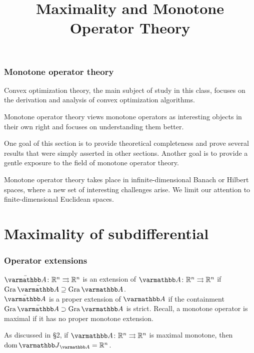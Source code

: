 \documentclass[10pt,mathserif]{beamer}
\title{\large \bfseries Maximality and Monotone Operator Theory}
\begin{document}
\frame{
\thispagestyle{empty}
\titlepage
}


\begin{frame}
\frametitle{Monotone operator theory}
Convex optimization theory, the main subject of study in this class, focuses on the derivation and analysis of convex optimization algorithms.
\vspace{0.2in}

Monotone operator theory views monotone operators as interesting objects in their own right and focuses on understanding them better.

\vspace{0.2in}

One goal of this section is to provide theoretical completeness and prove several results that were simply asserted in other sections.
Another goal is to provide a gentle exposure to the field of monotone operator theory.

\vspace{0.2in}

Monotone operator theory takes place in infinite-dimensional Banach or Hilbert spaces, where a new set of interesting challenges arise.
We limit our attention to finite-dimensional Euclidean spaces.

\end{frame}


\section{Maximality of subdifferential}

\begin{frame}
\frametitle{Operator extensions}
$\bar{\opA}\colon\reals^n\rightrightarrows \reals^n$ is an extension of $\opA\colon\reals^n\rightrightarrows \reals^n$ if $\gra \bar{\opA} \supseteq \gra \opA $.\\
$\bar{\opA}$ is a proper extension of $\opA$ if the containment $\gra \bar{\opA} \supset \gra \opA$ is strict.
Recall, a monotone operator is maximal if it has no proper monotone extension.
\vspace{0.2in}



As discussed in \S2, if $\opA\colon\reals^n\rightrightarrows \reals^n$ is maximal monotone, then $\dom \opJ_\opA=\reals^n$.


\end{frame}
\end{document}

